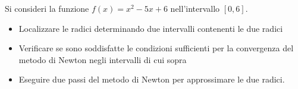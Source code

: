 Si consideri la funzione $f(x)=x^2-5x+6$ nell'intervallo $[0,6]$.

\begin{itemize}
\item
Localizzare le radici determinando due intervalli contenenti le
due radici
\item Verificare se sono soddisfatte le condizioni
sufficienti per la convergenza del metodo di Newton negli
intervalli di cui sopra
\item Eseguire due passi del metodo di Newton per approssimare le due radici.
\end{itemize}
